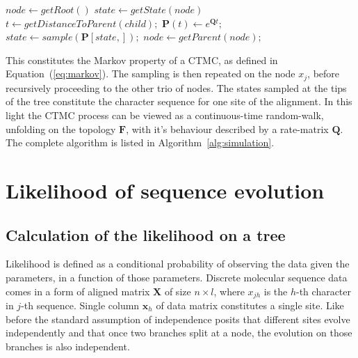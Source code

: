 \begin{algorithm}[H]
\centering
\begin{algorithmic}[1]
%
\State $node \gets getRoot\left(\right)$
%
\State $state \gets getState\left(node\right)$
%
\Repeat
%
%
%
\State $t \gets getDistanceToParent\left(child\right);$
%
\State $ \mathbf{P}\left(t\right) \gets e^{\mathbf{Q}t};$
%
\State $state \gets sample\left(\mathbf{P}\left[ state, \right]\right);$
%
\EndFor
%
\Else {}
%
\State $node \gets getParent\left(node\right);$
%
\EndIf
%
\end{algorithmic}
\caption{
{ \footnotesize 
{\bf Fabrication evolution along a phylogeny.} 
For a visited child node it's state is sampled with conditional probabilities of changing to state $j$ given state $i$ at the parental node.
}%
}
\label{alg:simulation}
\end{algorithm}

This constitutes the Markov property of a CTMC, as defined in Equation~(\ref{eq:markov}).
The sampling is then repeated on the node $x_j$, before recursively proceeding to the other trio of nodes.
The states sampled at the tips of the tree constitute the character sequence for one site of the alignment.
In this light the CTMC process can be viewed as a continuous-time random-walk, unfolding on the topology $\mathbf{F}$, with it's behaviour described by a rate-matrix $\mathbf{Q}$.
The complete algorithm is listed in Algorithm~\ref{alg:simulation}.

\section{Likelihood of sequence evolution}

\subsection{Calculation of the likelihood on a tree\label{sub:likelihood}}

Likelihood is defined as a conditional probability of observing the data given the parameters, in a function of those parameters.
Discrete molecular sequence data comes in a form of aligned matrix $\mathbf{X}$ of size $n \times l$, where $x_{jh}$ is the $h$-th character in $j$-th sequence.
Single column $\mathbf{x}_{h}$ of data matrix constitutes a single site.
Like before the standard assumption of independence posits that different sites evolve independently and that once two branches split at a node, the evolution on those branches is also independent.

